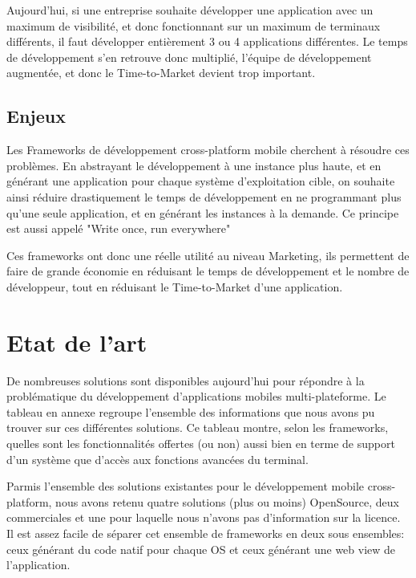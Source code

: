 \documentclass{article}
\begin{document}
Aujourd'hui, si une entreprise souhaite développer une application avec un maximum de visibilité, et donc fonctionnant sur un maximum de terminaux différents, il faut développer entièrement 3 ou 4 applications différentes. Le temps de développement s'en retrouve donc multiplié, l'équipe de développement augmentée, et donc le Time-to-Market devient trop important.

\subsection{Enjeux}
Les Frameworks de développement cross-platform mobile cherchent à résoudre ces problèmes. En abstrayant le développement à une instance plus haute, et en générant une application pour chaque système d'exploitation cible, on souhaite ainsi réduire drastiquement le temps de développement en ne programmant plus qu'une seule application, et en générant les instances à la demande. Ce principe est aussi appelé "Write once, run everywhere"

Ces frameworks ont donc une réelle utilité au niveau Marketing, ils permettent de faire de grande économie en réduisant le temps de développement et le nombre de développeur, tout en réduisant le Time-to-Market d'une application.

\newpage
\section{Etat de l'art}
De nombreuses solutions sont disponibles aujourd'hui pour répondre à la problématique du développement d'applications mobiles multi-plateforme. Le tableau en annexe regroupe l'ensemble des informations que nous avons pu trouver sur ces différentes solutions. Ce tableau montre, selon les frameworks, quelles sont les fonctionnalités offertes (ou non) aussi bien en terme de support d'un système que d'accès aux fonctions avancées du terminal.

Parmis l'ensemble des solutions existantes pour le développement mobile cross-platform, nous avons retenu quatre solutions (plus ou moins) OpenSource, deux commerciales et une pour laquelle nous n'avons pas d'information sur la licence.
Il est assez facile de séparer cet ensemble de frameworks en deux sous ensembles: ceux générant du code natif pour chaque OS et ceux générant une web view de l'application.
\end{document}
